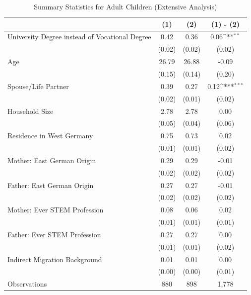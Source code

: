 \documentclass[a4paper, oneside, hyperfootnotes = false]{article}
\def\sym#1{\ifmmode^{#1}\else\(^{#1}\)\fi}
\begin{document}
{\begin{table}[ht]
\begin{center}
    \end{center}
\end{table}

\begin{table}[ht]
	\caption{Summary Statistics for Adult Children (Extensive Analysis)}
	\label{tab:descr_summary_epid_ext}
	\begin{center}
		\begin{tabular}{l*{3}{c}}
			\toprule
			& (1) & (2) & (1) - (2) \\
			\midrule
			University Degree instead of Vocational Degree & 0.42  & 0.36 & 0.06\sym{**}    \\
			&   (0.02)  & (0.02) & (0.02) \\
			\addlinespace
			Age         &   26.79   &  26.88   &  -0.09    \\
			&     (0.15) &        (0.14)         &      (0.20) \\
			\addlinespace
			Spouse/Life Partner &   0.39    &  0.27 &   0.12\sym{***}    \\
			&      (0.02)&          (0.01)&         (0.02) \\
			\addlinespace
			Household Size      &  2.78   & 2.78    &   0.00        \\
			&          (0.05)&       (0.04)   &   (0.06) \\
			\addlinespace
			Residence in West Germany  &  0.75   &  0.73   &  0.02    \\
			&         (0.01) &       (0.01)&  (0.02)\\
			\addlinespace
			Mother: East German Origin &  0.29   & 0.29    &  -0.01       \\
			&         (0.02) &   (0.02)&  (0.02)\\
			\addlinespace
			Father: East German Origin &  0.27   &   0.27  &    -0.01     \\
			&         (0.02) &       (0.02)&  (0.02)\\
			\addlinespace
			Mother: Ever STEM Profession & 0.08   &  0.06   &  0.02   \\
			&         (0.01) &       (0.01) &  (0.01) \\
			\addlinespace
			Father: Ever STEM Profession &   0.27  &  0.27   &  0.00   \\
			&         (0.01) &       (0.01)&  (0.02)\\
			\addlinespace
			Indirect Migration Background &  0.01   & 0.01    &  0.00    \\
			&         (0.00) &       (0.00)&  (0.01) \\
			\midrule
			Observations        &  880     &  898     &        1,778            \\
			\bottomrule
		\end{tabular}
		

\end{center}
\end{table}}
\end{document}
